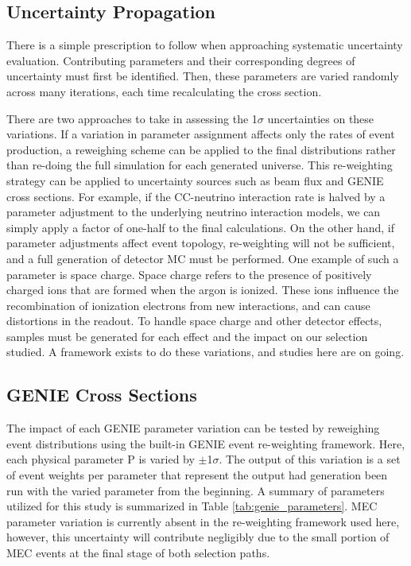 \subsection{Uncertainty Propagation} 
There is a simple prescription to follow when approaching systematic uncertainty evaluation. Contributing parameters and their corresponding degrees of uncertainty must first be identified.  Then, these parameters are varied randomly across many iterations, each time recalculating the cross section.
\par There are two approaches to take in assessing the 1$\sigma$ uncertainties on these variations. If a variation in parameter assignment affects only the rates of event production, a reweighing scheme can be applied to the final distributions rather than re-doing the full simulation for each generated universe.  This re-weighting strategy can be applied to uncertainty sources such as beam flux and GENIE cross sections.  For example, if the CC-neutrino interaction rate is halved by a parameter adjustment to the underlying neutrino interaction models, we can simply apply a factor of one-half to the final calculations.  On the other hand, if parameter adjustments affect event topology, re-weighting will not be sufficient, and a full generation of detector MC must be performed. One example of such a parameter is space charge. Space charge refers to the presence of positively charged ions that are formed when the argon is ionized.  These ions influence the recombination of ionization electrons from new interactions, and can cause distortions in the readout. To handle space charge and other detector effects, samples must be generated for each effect and the impact on our selection studied. A framework exists to do these variations, and studies here are on going. %

\subsection{GENIE Cross Sections}
The impact of each GENIE parameter variation can be tested by reweighing event distributions using the built-in GENIE event re-weighting framework. Here, each physical parameter P is varied by $\pm$1$\sigma$. The output of this variation is a set of event weights per parameter that represent the output had generation been run with the varied parameter from the beginning. A summary of parameters utilized for this study is summarized in Table \ref{tab:genie_parameters}. MEC parameter variation is currently absent in the re-weighting framework used here, however, this uncertainty will contribute negligibly due to the small portion of MEC events at the final stage of both selection paths.

